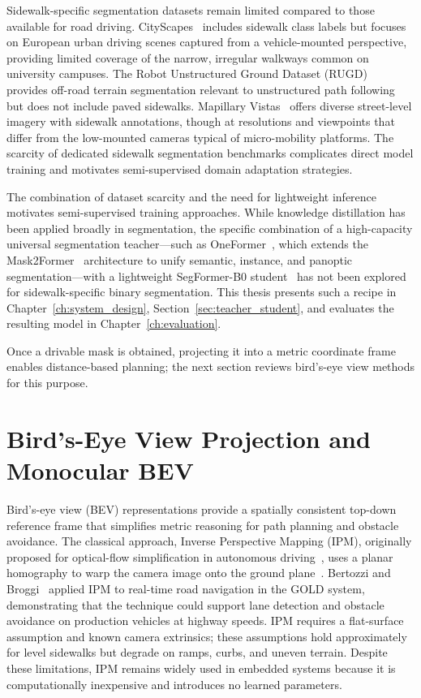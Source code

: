 \documentclass[12pt,letterpaper,oneside]{report}
\begin{document}
Sidewalk-specific segmentation datasets remain limited compared to those available for road driving. CityScapes~\cite{cityscapes} includes sidewalk class labels but focuses on European urban driving scenes captured from a vehicle-mounted perspective, providing limited coverage of the narrow, irregular walkways common on university campuses. The Robot Unstructured Ground Dataset (RUGD)~\cite{rugd} provides off-road terrain segmentation relevant to unstructured path following but does not include paved sidewalks. Mapillary Vistas~\cite{mapillary} offers diverse street-level imagery with sidewalk annotations, though at resolutions and viewpoints that differ from the low-mounted cameras typical of micro-mobility platforms. The scarcity of dedicated sidewalk segmentation benchmarks complicates direct model training and motivates semi-supervised domain adaptation strategies.

The combination of dataset scarcity and the need for lightweight inference motivates semi-supervised training approaches. While knowledge distillation has been applied broadly in segmentation, the specific combination of a high-capacity universal segmentation teacher---such as OneFormer~\cite{oneformer}, which extends the Mask2Former~\cite{mask2former} architecture to unify semantic, instance, and panoptic segmentation---with a lightweight SegFormer-B0 student~\cite{segformer} has not been explored for sidewalk-specific binary segmentation. This thesis presents such a recipe in Chapter~\ref{ch:system_design}, Section~\ref{sec:teacher_student}, and evaluates the resulting model in Chapter~\ref{ch:evaluation}.

Once a drivable mask is obtained, projecting it into a metric coordinate frame enables distance-based planning; the next section reviews bird's-eye view methods for this purpose.


\section{Bird's-Eye View Projection and Monocular BEV}
\label{sec:lit_bev}

Bird's-eye view (BEV) representations provide a spatially consistent top-down reference frame that simplifies metric reasoning for path planning and obstacle avoidance. The classical approach, Inverse Perspective Mapping (IPM), originally proposed for optical-flow simplification in autonomous driving~\cite{mallot1991ipm}, uses a planar homography to warp the camera image onto the ground plane~\cite{hartley_zisserman}. Bertozzi and Broggi~\cite{bertozzi1998gold} applied IPM to real-time road navigation in the GOLD system, demonstrating that the technique could support lane detection and obstacle avoidance on production vehicles at highway speeds. IPM requires a flat-surface assumption and known camera extrinsics; these assumptions hold approximately for level sidewalks but degrade on ramps, curbs, and uneven terrain. Despite these limitations, IPM remains widely used in embedded systems because it is computationally inexpensive and introduces no learned parameters.
\end{document}
